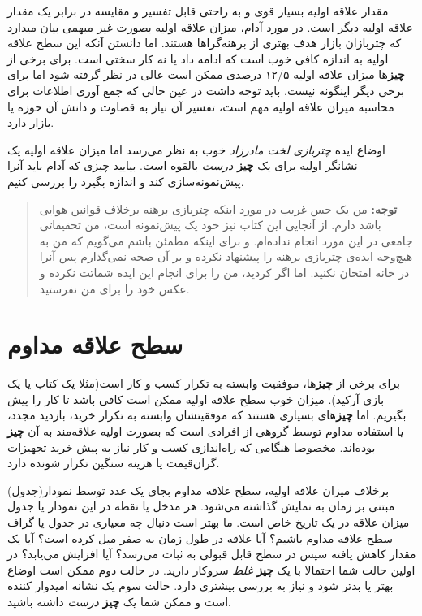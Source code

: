 مقدار علاقه اولیه بسیار قوی و به راحتی قابل تفسیر و مقایسه در برابر یک
مقدار علاقه اولیه دیگر است. در مورد آدام، میزان علاقه اولیه بصورت غیر
مبهمی بیان میدارد که چتربازان بازار هدف بهتری از برهنه‌گراها هستند. اما
دانستن آنکه این سطح علاقه اولیه به اندازه کافی خوب است که ادامه داد یا
نه کار سختی است. برای برخی از \textbf{چیز}ها میزان علاقه اولیه ۱۲/۵
درصدی ممکن است عالی در نظر گرفته شود اما برای برخی دیگر اینگونه نیست.
باید توجه داشت در عین حالی که جمع آوری اطلاعات برای محاسبه میزان علاقه
اولیه مهم است، تفسیر آن نیاز به قضاوت و دانش آن حوزه یا بازار دارد.

اوضاع ایده \emph{چتربازی لخت مادرزاد} خوب به نظر می‌رسد اما میزان علاقه
اولیه یک نشانگر اولیه برای یک \textbf{چیز} \emph{درست} بالقوه است.
بیایید چیزی که آدام باید آنرا پیش‌نمونه‌سازی کند و اندازه بگیرد را بررسی
کنیم.

\begin{quote}
\textbf{توجه:} من یک حس غریب در مورد اینکه چتربازی برهنه برخلاف قوانین
هوایی باشد دارم. از آنجایی این کتاب نیز خود یک پیش‌نمونه است، من
تحقیقاتی جامعی در این مورد انجام نداده‌ام. و برای اینکه مطمئن باشم
می‌گویم که من به هیچ‌وجه ایده‌ی چتربازی برهنه را پیشنهاد نکرده و بر آن
صحه نمی‌گذارم پس آنرا در خانه امتحان نکنید. اما اگر کردید، من را برای
انجام این ایده شماتت نکرده و عکس خود را برای من نفرستید.
\end{quote}

\section{سطح علاقه
مداوم}\label{ux633ux637ux62d-ux639ux644ux627ux642ux647-ux645ux62fux627ux648ux645}

برای برخی از \textbf{چیز}ها، موفقیت وابسته به تکرار کسب و کار است(مثلا
یک کتاب یا یک بازی آرکید). میزان خوب سطح علاقه اولیه ممکن است کافی باشد
تا کار را پیش بگیریم. اما \textbf{چیز}های بسیاری هستند که موفقیتشان
وابسته به تکرار خرید، بازدید مجدد، یا استفاده مداوم توسط گروهی از افرادی
است که بصورت اولیه علاقه‌مند به آن \textbf{چیز} بوده‌اند. مخصوصا هنگامی
که راه‌اندازی کسب و کار نیاز به پیش خرید تجهیزات گران‌قیمت یا هزینه
سنگین تکرار شونده دارد.

برخلاف میزان علاقه اولیه، سطح علاقه مداوم بجای یک عدد توسط نمودار(جدول)
مبتنی بر زمان به نمایش گذاشته می‌شود. هر مدخل یا نقطه در این نمودار یا
جدول میزان علاقه در یک تاریخ خاص است. ما بهتر است دنبال چه معیاری در
جدول یا گراف سطح علاقه مداوم باشیم؟ آیا علاقه در طول زمان به صفر میل
کرده است؟ آیا یک مقدار کاهش یافته سپس در سطح قابل قبولی به ثبات می‌رسد؟
آیا افزایش می‌یابد؟ در اولین حالت شما احتمالا با یک \textbf{چیز}
\emph{غلط} سروکار دارید. در حالت دوم ممکن است اوضاع بهتر یا بدتر شود و
نیاز به بررسی بیشتری دارد. حالت سوم یک نشانه امیدوار کننده است و ممکن
شما یک \textbf{چیز} \emph{درست} داشته باشید.

